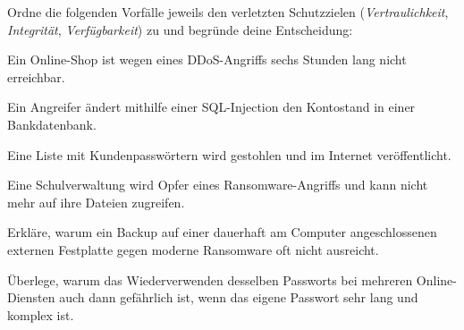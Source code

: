 \begin{compactenum}[a)]
\item Ordne die folgenden Vorfälle jeweils den verletzten Schutzzielen
(\emph{Vertraulichkeit}, \emph{Integrität}, \emph{Verfügbarkeit}) zu und
begründe deine Entscheidung:
\begin{compactenum}[1.]
  \item Ein Online-Shop ist wegen eines DDoS-Angriffs sechs Stunden lang nicht
  erreichbar.
  \item Ein Angreifer ändert mithilfe einer SQL-Injection den Kontostand in
  einer Bankdatenbank.
  \item Eine Liste mit Kundenpasswörtern wird gestohlen und im Internet
  veröffentlicht.
  \item Eine Schulverwaltung wird Opfer eines Ransomware-Angriffs und kann nicht
  mehr auf ihre Dateien zugreifen.
\end{compactenum}

\item Erkläre, warum ein Backup auf einer dauerhaft am Computer angeschlossenen
externen Festplatte gegen moderne Ransomware oft nicht ausreicht.

\item Überlege, warum das Wiederverwenden desselben Passworts bei mehreren
Online-Diensten auch dann gefährlich ist, wenn das eigene Passwort sehr lang
und komplex ist.
\end{compactenum}
